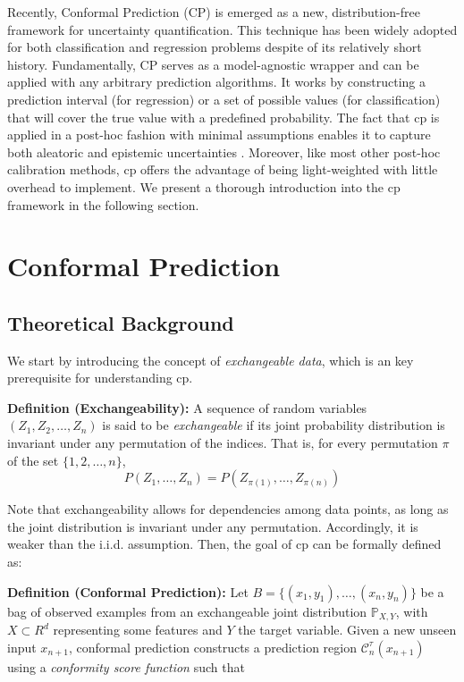 Recently, Conformal Prediction (CP) \cite{shafer2008tutorial, vovk2005algorithmic} is emerged as a new, distribution-free framework for uncertainty quantification. This technique has been widely adopted for both classification and regression problems despite of its relatively short history. Fundamentally, CP serves as a model-agnostic wrapper and can be applied with any arbitrary prediction algorithms. It works by constructing a prediction interval (for regression) or a set of possible values (for classification) that will cover the true value with a predefined probability. The fact that \gls{cp} is applied in a post-hoc fashion with minimal assumptions enables it to capture both aleatoric and epistemic uncertainties \cite{mossina2024CVPR}. Moreover, like most other post-hoc calibration methods, \gls{cp} offers the advantage of being light-weighted with little overhead to implement. We present a thorough introduction into the \gls{cp} framework in the following section.

\section{Conformal Prediction}
\label{sec: reviewCP}
\subsection{Theoretical Background}
We start by introducing the concept of \textit{exchangeable data}, which is an key prerequisite for understanding \gls{cp}.
\newline

\noindent
\textbf{Definition (Exchangeability):}  
A sequence of random variables \( (Z_1, Z_2, \dots, Z_n) \) is said to be \textit{exchangeable} if its joint probability distribution is invariant under any permutation of the indices. That is, for every permutation \( \pi \) of the set \( \{1, 2, \dots, n\} \),
\[
P(Z_1, \dots, Z_n) = P(Z_{\pi(1)}, \dots, Z_{\pi(n)})
\]

\noindent Note that exchangeability allows for dependencies among data points, as long as the joint distribution is invariant under any permutation. Accordingly, it is weaker than the i.i.d. assumption. Then, the goal of \gls{cp} can be formally defined as: 
\newline

\noindent
\textbf{Definition (Conformal Prediction):}  Let \(B = \{(x_1, y_1), \dots, (x_n, y_n)\}\) be a bag of observed examples from an exchangeable joint distribution $\mathbb{P}_{X,Y}$, with $X \subset R^d$ representing some features and  $Y$ the target variable. Given a new unseen input \(x_{n+1}\), conformal prediction constructs a prediction region \( \mathcal{C}_n^\tau(x_{n+1}) \) using a \textit{conformity score function} such that
\vspace{0.7em}

